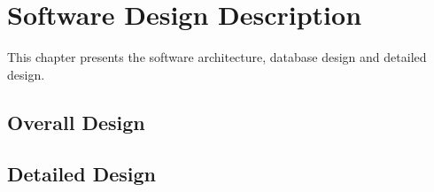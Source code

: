 \chapter{Software Design Description}

This chapter presents the software architecture,
database design and detailed design.

\section{Overall Design}




\section{Detailed Design}





